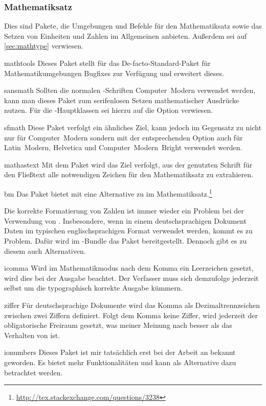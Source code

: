 \documentclass[%
  english,ngerman,%
  headings=optiontoheadandtoc,captions=tableheading,numbers=noenddot,%
  chapterpage,cdfoot,%
]{tudscrman}
\begin{document}
\subsubsection{Mathematiksatz}
Dies sind Pakete, die Umgebungen und Befehle für den Mathematiksatz sowie das 
Setzen von Einheiten und Zahlen im Allgemeinen anbieten. Außerdem sei auf 
\autoref{sec:mathtype} verwiesen.
\begin{packages}
  \item[mathtools]
    Dieses Paket stellt für das De-facto-Standard-Paket  für 
    Mathematikumgebungen Bugfixes zur Verfügung und erweitert dieses.
  \item[sansmath]
    Sollten die normalen -Schriften Computer~Modern verwendet 
    werden, kann man dieses Paket zum serifenlosen Setzen mathematischer 
    Ausdrücke nutzen. Für die \TUDScript-Hauptklassen sei hierzu auf die Option
     verwiesen.
  \item[sfmath]
    Diese Paket verfolgt ein ähnliches Ziel, kann jedoch im Gegensatz zu 
     nicht nur für Computer~Modern sondern mit der     
    entsprechenden Option auch für Latin~Modern, Helvetica und     
    Computer~Modern~Bright verwendet werden.
  \item[mathastext]
     Mit dem Paket wird das Ziel verfolgt, aus der genutzten Schrift für den 
     Fließtext alle notwendigen Zeichen für den Mathematiksatz zu extrahieren.
  \item[bm]
    Das Paket bietet mit  eine Alternative zu  im 
    Mathematiksatz.\footnote{\url{http://tex.stackexchange.com/questions/3238}}
\end{packages}
Die korrekte Formatierung von Zahlen ist immer wieder ein Problem bei der 
Verwendung von . Insbesondere, wenn in einem deutschsprachigen 
Dokument Daten im typischen englischsprachigen Format verwendet werden, kommt es 
zu Problem. Dafür wird im \KOMAScript{}-Bundle das Paket  
bereitgestellt. Dennoch gibt es zu diesem auch Alternativen.
\begin{packages}
  \item[icomma]
    Wird im Mathematikmodus nach dem Komma ein Leerzeichen gesetzt, wird dies 
    bei der Ausgabe beachtet. Der Verfasser muss sich demzufolge jederzeit 
    selbst um die typographisch korrekte Ausgabe kümmern.
  \item[ziffer]
    Für deutschsprachige Dokumente wird das Komma als Dezimaltrennzeichen 
    zwischen zwei Ziffern definiert. Folgt dem Komma keine Ziffer, wird 
    jederzeit der obligatorische Freiraum gesetzt, was meiner Meinung nach 
    besser als das Verhalten von  ist.
  \item[ionumbers]
    Dieses Paket ist mir tatsächlich erst bei der Arbeit an  
    bekannt geworden. Es bietet mehr Funktionalitäten und kann als Alternative 
    dazu betrachtet werden.
\end{packages}
\end{document}

